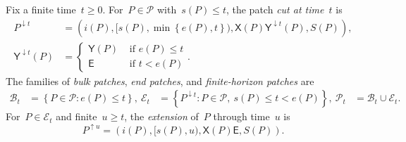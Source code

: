 \documentclass[EJP,preprint,NODS,nobera]{ejpecp}
\newcommand{\bb}[1]{\left(#1\right)}
\newcommand{\cb}[1]{\left\{#1\right\}}
\newcommand{\pw}[4]{\left\{\begin{array}{cl}
  #1 &\text{ if } #2 \\
  #3 &\text{ if } #4
\end{array}\right.}
\begin{document}
\begin{definition}
\label{def:bulk-end-patches}
Fix a finite time~$t\geq0$. For~$P\in\mathcal P$ with~$s(P)\leq t$, the patch
\emph{cut at time~$t$} is
\begin{equation*}
\begin{aligned}
P^{\downarrow t}
&=
\bb{
 i(P),
 [s(P),\min\cb{e(P),t}),
 \mathsf X(P)\mathsf Y^{\downarrow t}(P),
 S(P)
},
\\
\mathsf Y^{\downarrow t}(P)
&=
\pw{\mathsf Y(P)}{e(P)\leq t}{\mathsf E}{t<e(P)}.
\end{aligned}
\end{equation*}
The families of \emph{bulk patches}, \emph{end patches}, and
\emph{finite-horizon patches} are
\begin{align*}
\mathcal B_t
&=
\cb{P\in\mathcal P:e(P)\leq t},
\
\mathcal E_t
&=
\cb{P^{\downarrow t}:P\in\mathcal P,\ s(P)\leq t<e(P)},
\
\mathcal P_t
&=
\mathcal B_t\cup\mathcal E_t.
\end{align*}
For~$P\in\mathcal E_t$ and finite~$u\geq t$, the \emph{extension} of~$P$
through time~$u$ is
\begin{equation}
\label{eq:geometric-patch-extension}
P^{\uparrow u}
=
\bb{i(P),[s(P),u),\mathsf X(P)\mathsf E,S(P)}.
\end{equation}
\end{definition}
\end{document}
